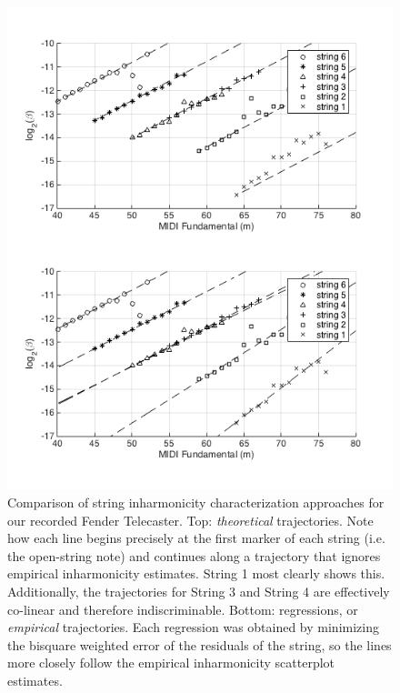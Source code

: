 \documentclass[12pt]{cmuthesis}
\begin{document}
\begin{figure}[!htbp] 
\centering
\includegraphics[scale=0.75]{traj-v-reg}
\caption{Comparison of string inharmonicity characterization approaches for our recorded Fender Telecaster. Top: \textit{theoretical} trajectories. Note how each line begins precisely at the first marker of each string (i.e. the open-string note) and continues along a trajectory that ignores empirical inharmonicity estimates. String 1 most clearly shows this. Additionally, the trajectories for String 3 and String 4 are effectively co-linear and therefore indiscriminable. Bottom: regressions, or \textit{empirical} trajectories. Each regression was obtained by minimizing the bisquare weighted error of the residuals of the string, so the lines more closely follow the empirical inharmonicity scatterplot estimates.}
\label{fig:traj-v-reg}
\end{figure}
\end{document}
